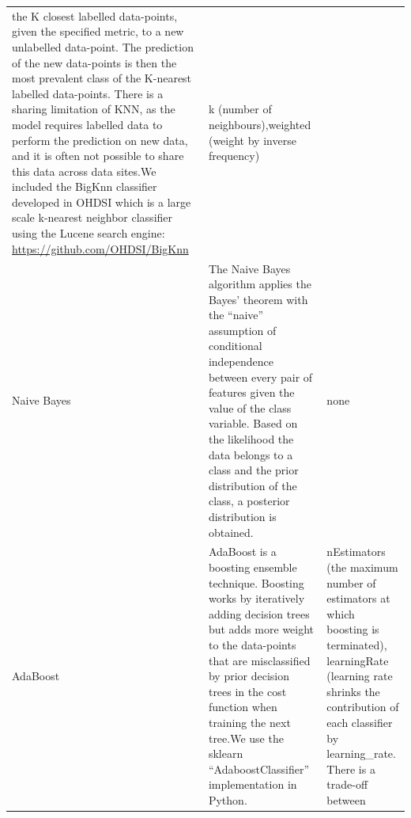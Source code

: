 \documentclass[]{article}
\begin{document}
\begin{longtable}[]{@{}lll@{}}
\begin{minipage}[t]{0.55\columnwidth}
the K closest labelled data-points, given the specified metric, to a new
unlabelled data-point. The prediction of the new data-points is then the
most prevalent class of the K-nearest labelled data-points. There is a
sharing limitation of KNN, as the model requires labelled data to
perform the prediction on new data, and it is often not possible to
share this data across data sites.We included the BigKnn classifier
developed in OHDSI which is a large scale k-nearest neighbor classifier
using the Lucene search engine:
\url{https://github.com/OHDSI/BigKnn}\strut
\end{minipage} & \begin{minipage}[t]{0.25\columnwidth}\raggedright\strut
k (number of neighbours),weighted (weight by inverse frequency)\strut
\end{minipage}\tabularnewline
\begin{minipage}[t]{0.12\columnwidth}\raggedright\strut
Naive Bayes\strut
\end{minipage} & \begin{minipage}[t]{0.55\columnwidth}\raggedright\strut
The Naive Bayes algorithm applies the Bayes' theorem with the ``naive''
assumption of conditional independence between every pair of features
given the value of the class variable. Based on the likelihood the data
belongs to a class and the prior distribution of the class, a posterior
distribution is obtained.\strut
\end{minipage} & \begin{minipage}[t]{0.25\columnwidth}\raggedright\strut
none\strut
\end{minipage}\tabularnewline
\begin{minipage}[t]{0.12\columnwidth}\raggedright\strut
AdaBoost\strut
\end{minipage} & \begin{minipage}[t]{0.55\columnwidth}\raggedright\strut
AdaBoost is a boosting ensemble technique. Boosting works by iteratively
adding decision trees but adds more weight to the data-points that are
misclassified by prior decision trees in the cost function when training
the next tree.We use the sklearn ``AdaboostClassifier'' implementation
in Python.\strut
\end{minipage} & \begin{minipage}[t]{0.25\columnwidth}\raggedright\strut
nEstimators (the maximum number of estimators at which boosting is
terminated), learningRate (learning rate shrinks the contribution of
each classifier by learning\_rate. There is a trade-off between

\end{minipage}
\end{longtable}
\end{document}
